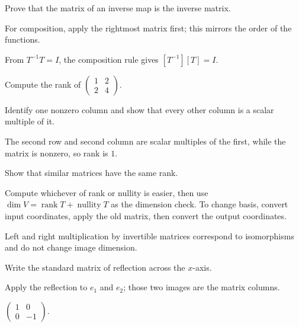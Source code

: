 \begin{exercise}\label{exr:i07-03}
Prove that the matrix of an inverse map is the inverse matrix.
\end{exercise}
\begin{hint}
For composition, apply the rightmost matrix first; this mirrors the order of the functions.
\end{hint}
\begin{solution}
From $T^{-1}T=I$, the composition rule gives $[T^{-1}][T]=I$.
\end{solution}

\begin{exercise}\label{exr:i07-04}
Compute the rank of $\begin{pmatrix}1&2\\2&4\end{pmatrix}$.
\end{exercise}
\begin{hint}
Identify one nonzero column and show that every other column is a scalar multiple of it.
\end{hint}
\begin{solution}
The second row and second column are scalar multiples of the first, while the matrix is nonzero, so rank is $1$.
\end{solution}

\begin{exercise}\label{exr:i07-05}
Show that similar matrices have the same rank.
\end{exercise}
\begin{hint}
Compute whichever of rank or nullity is easier, then use \(\dim V=\operatorname{rank}T+\operatorname{nullity}T\) as the dimension check. To change basis, convert input coordinates, apply the old matrix, then convert the output coordinates.
\end{hint}
\begin{solution}
Left and right multiplication by invertible matrices correspond to isomorphisms and do not change image dimension.
\end{solution}

\begin{exercise}\label{exr:i07-06}
Write the standard matrix of reflection across the $x$-axis.
\end{exercise}
\begin{hint}
Apply the reflection to \(e_1\) and \(e_2\); those two images are the matrix columns.
\end{hint}
\begin{solution}
$\begin{pmatrix}1&0\\0&-1\end{pmatrix}$.
\end{solution}

